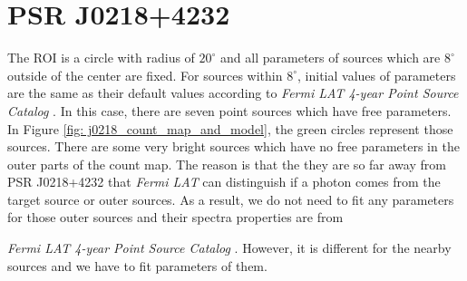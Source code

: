 \documentclass[12pt]{report}
\newcommand{\mycaption}[1]{\protect \caption{#1}}
\newcommand{\fgl}[0]{
  \textit{Fermi LAT 4-year Point Source Catalog}
}
\begin{document}
          \begin{table}[!ht]
            \centering
            \mycaption{Fit results with data from year 2009 to year 2018. The physical 
              meanings of $\Gamma$ and $E_c$ are the same as Table 
              \ref{table: previous_result_comparison}.}
            \label{table: 2018_fit_data}
          \end{table}
          \vspace{1cm}            

        \section{PSR J0218+4232}
          The ROI is a circle with radius of $20^\circ$ and all parameters of sources which 
          are $8^\circ$ outside of the center are fixed. For sources within $8^\circ$, initial
          values of parameters are the same as their default values according to \fgl.
          In this case, there are seven point sources which have free parameters. In Figure
          \ref{fig: j0218_count_map_and_model}, the green circles represent those sources.
          There are some very bright sources which have no free parameters
          in the outer parts of the count map. The reason is that the they are so far away 
          from PSR J0218+4232 that \textit{Fermi LAT} can distinguish if a photon comes 
          from the target source or outer sources. As a result, we do not need to fit 
          any parameters for those outer sources and their spectra properties are from 
          \fgl. However, it is different for the nearby sources and we have to fit parameters
          of them.
          
\end{document}
